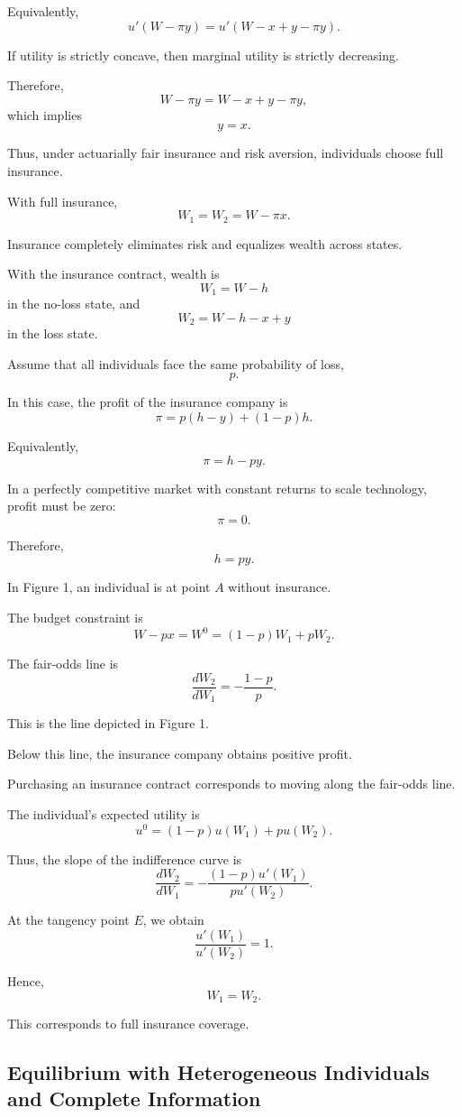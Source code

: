 Equivalently,
\[
u'(W-\pi y)
=
u'(W-x+y-\pi y).
\]

If utility is strictly concave, then marginal utility is strictly decreasing.

Therefore,
\[
W-\pi y
=
W-x+y-\pi y,
\]
which implies
\[
y=x.
\]

Thus, under actuarially fair insurance and risk aversion, individuals choose full insurance.

With full insurance,
\[
W_1=W_2=W-\pi x.
\]

Insurance completely eliminates risk and equalizes wealth across states.



With the insurance contract, wealth is
\[
W_1=W-h
\]
in the no-loss state, and
\[
W_2=W-h-x+y
\]
in the loss state.

Assume that all individuals face the same probability of loss,
\[
p.
\]

In this case, the profit of the insurance company is
\[
\pi
=
p(h-y)+(1-p)h.
\]

Equivalently,
\[
\pi
=
h-py.
\]

In a perfectly competitive market with constant returns to scale technology, profit must be zero:
\[
\pi=0.
\]

Therefore,
\[
h=py.
\]

In Figure 1, an individual is at point \(A\) without insurance.

The budget constraint is
\[
W-px
=
W^0
=
(1-p)W_1+pW_2.
\]

The fair-odds line is
\[
\frac{dW_2}{dW_1}
=
-\frac{1-p}{p}.
\]

This is the line depicted in Figure 1.

Below this line, the insurance company obtains positive profit.

Purchasing an insurance contract corresponds to moving along the fair-odds line.

The individual's expected utility is
\[
u^0
=
(1-p)u(W_1)+pu(W_2).
\]

Thus, the slope of the indifference curve is
\[
\frac{dW_2}{dW_1}
=
-
\frac{(1-p)u'(W_1)}{pu'(W_2)}.
\]

At the tangency point \(E\), we obtain
\[
\frac{u'(W_1)}{u'(W_2)}=1.
\]

Hence,
\[
W_1=W_2.
\]

This corresponds to full insurance coverage.

\subsection{Equilibrium with Heterogeneous Individuals and Complete Information}

